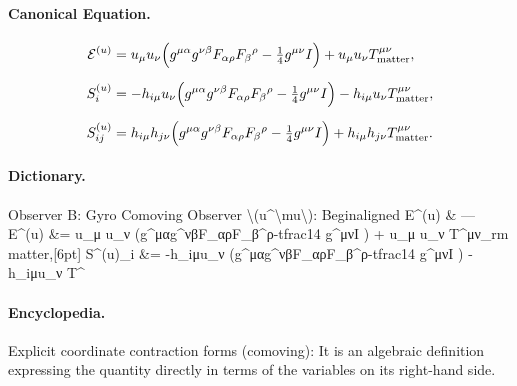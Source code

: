 \paragraph{Canonical Equation.}
\[
\begin{aligned} \mathcal{E}^{(u)} &= u_\mu u_\nu\Big(g^{\mu\alpha}g^{\nu\beta}F_{\alpha\rho}F_{\beta}{}^{\rho}-\tfrac14 g^{\mu\nu}I\Big) + u_\mu u_\nu T^{\mu\nu}_{\rm matter},\\[6pt] S^{(u)}_i &= -h_{i\mu}u_\nu\Big(g^{\mu\alpha}g^{\nu\beta}F_{\alpha\rho}F_{\beta}{}^{\rho}-\tfrac14 g^{\mu\nu}I\Big) - h_{i\mu}u_\nu T^{\mu\nu}_{\rm matter},\\[6pt] S^{(u)}_{ij} &= h_{i\mu}h_{j\nu}\Big(g^{\mu\alpha}g^{\nu\beta}F_{\alpha\rho}F_{\beta}{}^{\rho}-\tfrac14 g^{\mu\nu}I\Big) + h_{i\mu}h_{j\nu}T^{\mu\nu}_{\rm matter}. \end{aligned}
\]

\paragraph{Dictionary.}
Observer B: Gyro Comoving Observer \textbackslash{}(u\textasciicircum{}\textbackslash{}mu\textbackslash{}): Beginaligned E\textasciicircum{}(u) \& — E\textasciicircum{}(u) \&= u\_μ u\_ν (g\textasciicircum{}μαg\textasciicircum{}νβF\_αρF\_β\textasciicircum{}ρ-tfrac14 g\textasciicircum{}μνI ) + u\_μ u\_ν T\textasciicircum{}μν\_rm matter,[6pt] S\textasciicircum{}(u)\_i \&= -h\_iμu\_ν (g\textasciicircum{}μαg\textasciicircum{}νβF\_αρF\_β\textasciicircum{}ρ-tfrac14 g\textasciicircum{}μνI ) - h\_iμu\_ν T\textasciicircum{}

\paragraph{Encyclopedia.}
Explicit coordinate contraction forms (comoving): It is an algebraic definition expressing the quantity directly in terms of the variables on its right-hand side.

